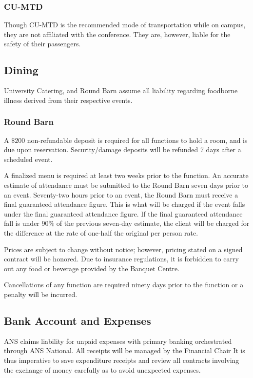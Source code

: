 \subsubsection{CU-MTD}
Though CU-MTD is the recommended mode of transportation while on campus, they are not affiliated with the conference. They are, however, liable for the safety of their passengers.

\subsection{Dining}
University Catering, and Round Barn assume all liability regarding foodborne illness derived from their respective events.

\subsubsection{Round Barn}
A $\$200$ non-refundable deposit is required for all functions to hold a room, and is due upon reservation. Security/damage deposits will be refunded 7 days after a scheduled event. 

A finalized menu is required at least two weeks prior to the function. An accurate estimate of attendance must be submitted to the Round Barn seven days prior to an event.
Seventy-two hours prior to an event, the Round Barn must receive a final guaranteed attendance figure. This is what will be charged if the event falls under the final guaranteed attendance figure. If the final guaranteed attendance fall is under 90$\%$ of the previous seven-day estimate, the client will be charged for the difference at the rate of one-half the original per person rate.

Prices are subject to change without notice; however, pricing stated on a signed contract will be honored. Due to insurance regulations, it is forbidden to carry out any food or beverage provided by the Banquet Centre.

Cancellations of any function are required ninety days prior to the function or a penalty will be incurred.

\subsection{Bank Account and Expenses}
ANS claims liability for unpaid expenses with primary banking orchestrated through ANS National. All receipts will be managed by the Financial Chair It is thus imperative to save expenditure receipts and review all contracts involving the exchange of money carefully as to avoid unexpected expenses. 

